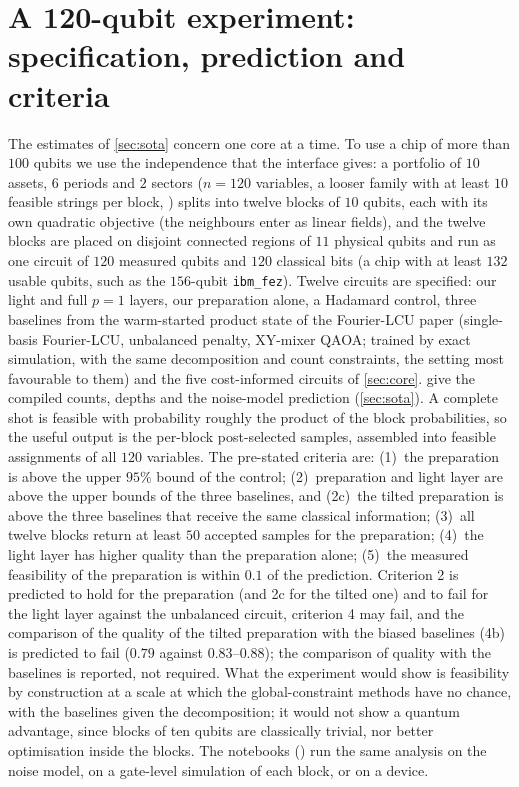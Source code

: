 \section{A 120-qubit experiment: specification, prediction and criteria}\label{app:hw100}
The estimates of \cref{sec:sota} concern one core at a time. To use a chip of more than $100$ qubits we use the independence that the interface gives: a portfolio of $10$ assets, $6$ periods and $2$ sectors ($n=120$ variables, a looser family with at least $10$ feasible strings per block, ) splits into twelve blocks of $10$ qubits, each with its own quadratic objective (the neighbours enter as linear fields), and the twelve blocks are placed on disjoint connected regions of $11$ physical qubits and run as one circuit of $120$ measured qubits and $120$ classical bits (a chip with at least $132$ usable qubits, such as the $156$-qubit \texttt{ibm\_fez}). Twelve circuits are specified: our light and full $p=1$ layers, our preparation alone, a Hadamard control, three baselines from the warm-started product state of the Fourier-LCU paper (single-basis Fourier-LCU, unbalanced penalty, XY-mixer QAOA; trained by exact simulation, with the same decomposition and count constraints, the setting most favourable to them) and the five cost-informed circuits of \cref{sec:core}.  give the compiled counts, depths and the noise-model prediction (\cref{sec:sota}). A complete shot is feasible with probability roughly the product of the block probabilities, so the useful output is the per-block post-selected samples, assembled into feasible assignments of all $120$ variables. The pre-stated criteria are: (1)~the preparation is above the upper $95\%$ bound of the control; (2)~preparation and light layer are above the upper bounds of the three baselines, and (2c)~the tilted preparation is above the three baselines that receive the same classical information; (3)~all twelve blocks return at least $50$ accepted samples for the preparation; (4)~the light layer has higher quality than the preparation alone; (5)~the measured feasibility of the preparation is within $0.1$ of the prediction. Criterion 2 is predicted to hold for the preparation (and 2c for the tilted one) and to fail for the light layer against the unbalanced circuit, criterion 4 may fail, and the comparison of the quality of the tilted preparation with the biased baselines (4b) is predicted to fail ($0.79$ against $0.83$--$0.88$); the comparison of quality with the baselines is reported, not required. What the experiment would show is feasibility by construction at a scale at which the global-constraint methods have no chance, with the baselines given the decomposition; it would not show a quantum advantage, since blocks of ten qubits are classically trivial, nor better optimisation inside the blocks. The notebooks () run the same analysis on the noise model, on a gate-level simulation of each block, or on a device.

